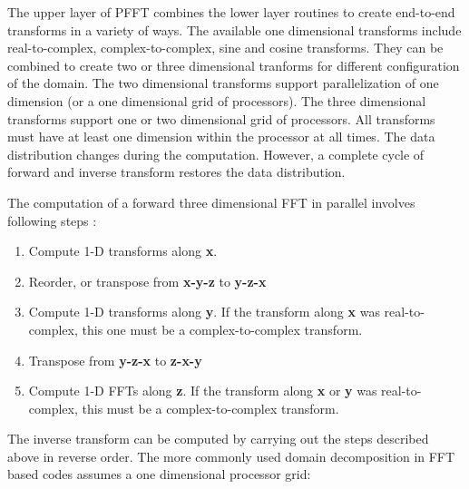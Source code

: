 The upper layer of PFFT combines the lower layer routines to create
end-to-end transforms in a variety of ways. The available one
dimensional transforms include real-to-complex, complex-to-complex,
sine and cosine transforms. They can be combined to create two or
three dimensional tranforms for different configuration of the domain.
The two dimensional transforms support parallelization of one
dimension (or a one dimensional grid of  processors). 
The three dimensional transforms support one or two dimensional grid of
processors. All transforms must have at least one dimension within the
processor at all times. The data distribution changes during the
computation. However, a complete cycle of forward and inverse
transform restores the data distribution. 

The computation of a forward three dimensional FFT in parallel involves 
following steps :   
\begin {enumerate}
\item Compute 1-D transforms along {\bf x}.
\item Reorder, or transpose from {\bf x-y-z} to {\bf y-z-x}
\item Compute 1-D  transforms along {\bf y}. If the transform along
{\bf x} was real-to-complex, this one must be a complex-to-complex transform.
\item Transpose from {\bf y-z-x} to {\bf z-x-y}
\item Compute 1-D FFTs along {\bf z}. If the transform along {\bf x}
or {\bf y} was real-to-complex, this must be a complex-to-complex transform.
\end {enumerate} 

The inverse transform can be computed by carrying out the steps
described above in reverse order. The more commonly used domain
decomposition in FFT based codes assumes a one dimensional processor grid:

